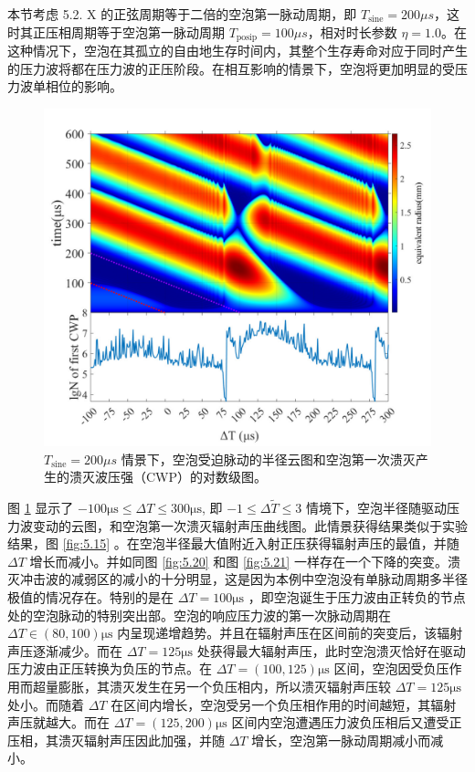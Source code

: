 本节考虑 5.2. X 的正弦周期等于二倍的空泡第一脉动周期，即
$T_\mathrm{sine}=200 \mu s$，这时其正压相周期等于空泡第一脉动周期
$T_\mathrm{posip}=100\mu s$，相对时长参数
$\eta =1.0$。在这种情况下，空泡在其孤立的自由地生存时间内，其整个生存寿命对应于同时产生的压力波将都在压力波的正压阶段。在相互影响的情景下，空泡将更加明显的受压力波单相位的影响。

\begin{figure}[H]
  \centering
  \includegraphics[width=0.9\linewidth]{img/fig5.22-eps-converted-to.pdf}
  \caption{$T_\mathrm{sine}=200 \mu s$
情景下，空泡受迫脉动的半径云图和空泡第一次溃灭产生的溃灭波压强（CWP）的对数级图。}
  \label{fig:5.22}
\end{figure}


图 \ref{fig:5.22} 显示了 $-100\mathrm{\mu s}\leq\Delta T\leq300\mathrm{\mu s}$,
即 $-1\leq\Delta \tilde{T} \leq3$
情境下，空泡半径随驱动压力波变动的云图，和空泡第一次溃灭辐射声压曲线图。此情景获得结果类似于实验结果，图
\ref{fig:5.15} 。在空泡半径最大值附近入射正压获得辐射声压的最值，并随 $\Delta T$
增长而减小。并如同图 \ref{fig:5.20} 和图 \ref{fig:5.21} 
一样存在一个下降的突变。溃灭冲击波的减弱区的减小的十分明显，这是因为本例中空泡没有单脉动周期多半径极值的情况存在。特别的是在
$\Delta T=100\mathrm{\mu s}$
，即空泡诞生于压力波由正转负的节点处的空泡脉动的特别突出部。空泡的响应压力波的第一次脉动周期在
$\Delta T\in (80,100)\mathrm{\mu s}$
内呈现递增趋势。并且在辐射声压在区间前的突变后，该辐射声压逐渐减少。而在
$\Delta T=125\mathrm{\mu s}$
处获得最大辐射声压，此时空泡溃灭恰好在驱动压力波由正压转换为负压的节点。在
$\Delta T=(100,125)\mathrm{\mu s}$
区间，空泡因受负压作用而超量膨胀，其溃灭发生在另一个负压相内，所以溃灭辐射声压较
$\Delta T=125\mathrm{\mu s}$ 处小。而随着 $\Delta T$
在区间内增长，空泡受另一个负压相作用的时间越短，其辐射声压就越大。而在
$\Delta T=(125,200)\mathrm{\mu s}$
区间内空泡遭遇压力波负压相后又遭受正压相，其溃灭辐射声压因此加强，并随
$\Delta T$ 增长，空泡第一脉动周期减小而减小。

